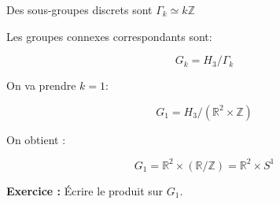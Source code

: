 \documentclass[11pt,a4paper]{article}
\begin{document}
Des sous-groupes discrets sont $\Gamma_k \simeq k\mathbb{Z}$

\medskip

Les groupes connexes correspondants sont:

\[
G_k = H_3 / \Gamma_k
\]

On va prendre $k = 1$:

\[
G_1 = H_3 / (\mathbb{R}^2 \times \mathbb{Z})
\]

On obtient :

\[
G_1 = \mathbb{R}^2 \times (\mathbb{R}/\mathbb{Z}) = \mathbb{R}^2 \times S^1
\]

\textbf{Exercice :} Écrire le produit sur $G_1$.
\end{document}
